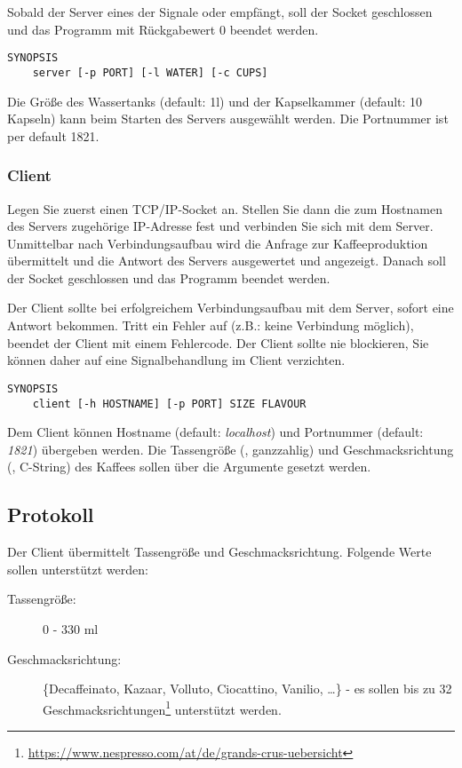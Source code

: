 Sobald der Server eines der Signale  oder
 empfängt, soll der Socket geschlossen und das
Programm mit Rückgabewert 0 beendet werden.

\begin{verbatim}
SYNOPSIS
    server [-p PORT] [-l WATER] [-c CUPS]
\end{verbatim}

Die Größe des Wassertanks (default: 1l) und der Kapselkammer (default: 10
Kapseln) kann beim Starten des Servers ausgewählt werden. Die Portnummer ist
per default 1821.

\subsubsection*{Client}
Legen Sie zuerst einen TCP/IP-Socket an. Stellen Sie dann die zum Hostnamen des
Servers zugehörige IP-Adresse fest und verbinden Sie sich mit dem
Server. Unmittelbar nach Verbindungsaufbau wird die Anfrage zur
Kaffeeproduktion übermittelt und die Antwort des Servers ausgewertet und
angezeigt. Danach soll der Socket geschlossen und das Programm beendet werden.

Der Client sollte bei erfolgreichem Verbindungsaufbau mit dem Server, sofort
eine Antwort bekommen. Tritt ein Fehler auf (z.B.: keine Verbindung möglich),
beendet der Client mit einem Fehlercode. Der Client sollte nie blockieren, Sie
können daher auf eine Signalbehandlung im Client verzichten.

\begin{verbatim}
SYNOPSIS
    client [-h HOSTNAME] [-p PORT] SIZE FLAVOUR
\end{verbatim}

Dem Client können Hostname (default: \emph{localhost}) und Portnummer (default:
\emph{1821}) übergeben werden. Die Tassengröße (, ganzzahlig)
und Geschmacksrichtung (, C-String) des Kaffees sollen über
die Argumente gesetzt werden.

\subsection*{Protokoll}
\label{sec:prot}
Der Client übermittelt Tassengröße und Geschmacksrichtung. Folgende Werte
sollen unterstützt werden:
%
\begin{description}
\item[Tassengröße:] 0 - 330 ml
\item[Geschmacksrichtung:] \{Decaffeinato, Kazaar, Volluto, Ciocattino,
  Vanilio, \dots\} - es sollen bis zu 32
  Geschmacksrichtungen\footnote{\url{https://www.nespresso.com/at/de/grands-crus-uebersicht}}
  unterstützt werden.
\end{description}

